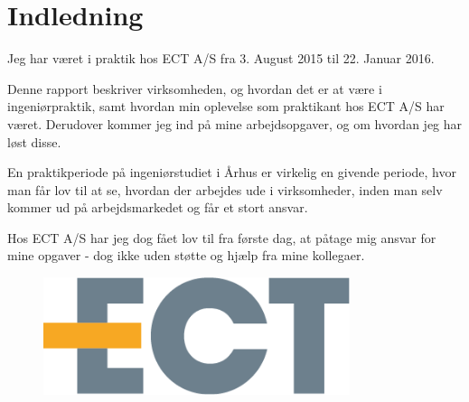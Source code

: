 \chapter{Indledning}

Jeg har været i praktik hos ECT A/S fra 3. August 2015 til 22. Januar 2016. 

Denne rapport beskriver virksomheden, og hvordan det er at være i ingeniørpraktik, samt hvordan min oplevelse som praktikant hos ECT A/S har været. Derudover kommer jeg ind på mine arbejdsopgaver, og om hvordan jeg har løst disse.

En praktikperiode på ingeniørstudiet i Århus er virkelig en givende periode, hvor man får lov til at se, hvordan der arbejdes ude i virksomheder, inden man selv kommer ud på arbejdsmarkedet og får et stort ansvar. 

Hos ECT A/S har jeg dog fået lov til fra første dag, at påtage mig ansvar for mine opgaver - dog ikke uden støtte og hjælp fra mine kollegaer.

\hfill\break
\hfill\break
\hfill\break
\hfill\break
\hfill\break
\hfill\break
\hfill\break

\begin{figure}[H] \centering
	\includegraphics[width=0.8\textwidth]{billeder/logo}
\end{figure} 